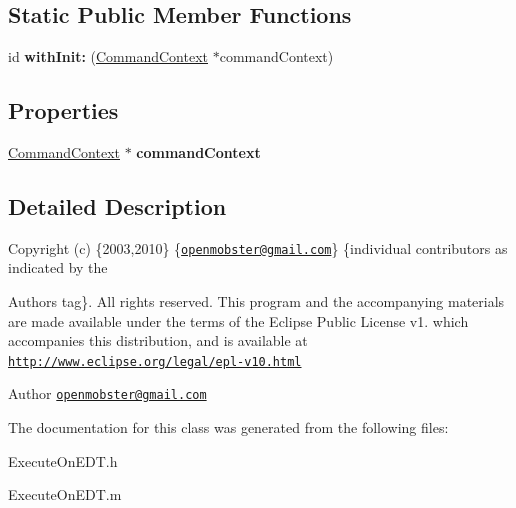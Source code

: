 \subsection*{\-Static \-Public \-Member \-Functions}
\begin{DoxyCompactItemize}
\item 
\hypertarget{interface_execute_on_e_d_t_a28023d6426d9710d4d127cd38295fda5}{
id {\bfseries with\-Init\-:} (\hyperlink{interface_command_context}{\-Command\-Context} $\ast$command\-Context)}
\label{interface_execute_on_e_d_t_a28023d6426d9710d4d127cd38295fda5}

\end{DoxyCompactItemize}
\subsection*{\-Properties}
\begin{DoxyCompactItemize}
\item 
\hypertarget{interface_execute_on_e_d_t_aa9cc42fe3c21be740000149cff92c6e3}{
\hyperlink{interface_command_context}{\-Command\-Context} $\ast$ {\bfseries command\-Context}}
\label{interface_execute_on_e_d_t_aa9cc42fe3c21be740000149cff92c6e3}

\end{DoxyCompactItemize}


\subsection{\-Detailed \-Description}
\-Copyright (c) \{2003,2010\} \{\href{mailto:openmobster@gmail.com}{\tt openmobster@gmail.\-com}\} \{individual contributors as indicated by the \begin{DoxyAuthor}{\-Authors}
tag\}. \-All rights reserved. \-This program and the accompanying materials are made available under the terms of the \-Eclipse \-Public \-License v1. which accompanies this distribution, and is available at \href{http://www.eclipse.org/legal/epl-v10.html}{\tt http\-://www.\-eclipse.\-org/legal/epl-\/v10.\-html}
\end{DoxyAuthor}
\begin{DoxyAuthor}{\-Author}
\href{mailto:openmobster@gmail.com}{\tt openmobster@gmail.\-com} 
\end{DoxyAuthor}


\-The documentation for this class was generated from the following files\-:\begin{DoxyCompactItemize}
\item 
\-Execute\-On\-E\-D\-T.\-h\item 
\-Execute\-On\-E\-D\-T.\-m\end{DoxyCompactItemize}
